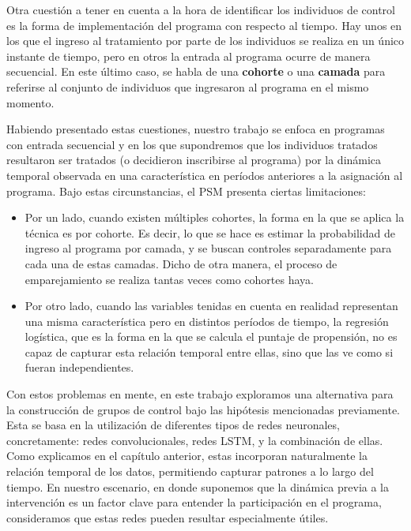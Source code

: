 \documentclass[../main.tex]{subfiles}
\begin{document}
Otra cuestión a tener en cuenta a la hora de identificar los individuos de control es la
forma de implementación del programa con respecto al tiempo. Hay unos en los que el
ingreso al tratamiento por parte de los individuos se realiza en un único instante de
tiempo, pero en otros la entrada al programa ocurre de manera secuencial. En este último
caso, se habla de una \textbf{cohorte} o una \textbf{camada} para referirse al conjunto de
individuos que ingresaron al programa en el mismo momento.

Habiendo presentado estas cuestiones, nuestro trabajo se enfoca en programas con entrada
secuencial y en los que supondremos que los individuos tratados resultaron ser tratados (o
decidieron inscribirse al programa) por la dinámica temporal observada en una
característica en períodos anteriores a la asignación al programa. Bajo estas
circunstancias, el PSM presenta ciertas limitaciones:
\begin{itemize}
    \item Por un lado, cuando existen múltiples cohortes, la forma en la que se aplica la
    técnica es por cohorte. Es decir, lo que se hace es estimar la probabilidad de ingreso
    al programa por camada, y se buscan controles separadamente para cada una de estas
    camadas. Dicho de otra manera, el proceso de emparejamiento se realiza tantas veces
    como cohortes haya.
    \item Por otro lado, cuando las variables tenidas en cuenta en realidad representan
    una misma característica pero en distintos períodos de tiempo, la regresión logística,
    que es la forma en la que se calcula el puntaje de propensión, no es capaz de capturar
    esta relación temporal entre ellas, sino que las ve como si fueran independientes.
\end{itemize}

Con estos problemas en mente, en este trabajo exploramos una alternativa para la
construcción de grupos de control bajo las hipótesis mencionadas previamente. Esta se basa
en la utilización de diferentes tipos de redes neuronales, concretamente: redes
convolucionales, redes LSTM, y la combinación de ellas. Como explicamos en el capítulo
anterior, estas incorporan naturalmente la relación temporal de los datos, permitiendo
capturar patrones a lo largo del tiempo. En nuestro escenario, en donde suponemos que la
dinámica previa a la intervención es un factor clave para entender la participación en el
programa, consideramos que estas redes pueden resultar especialmente útiles.
\end{document}
